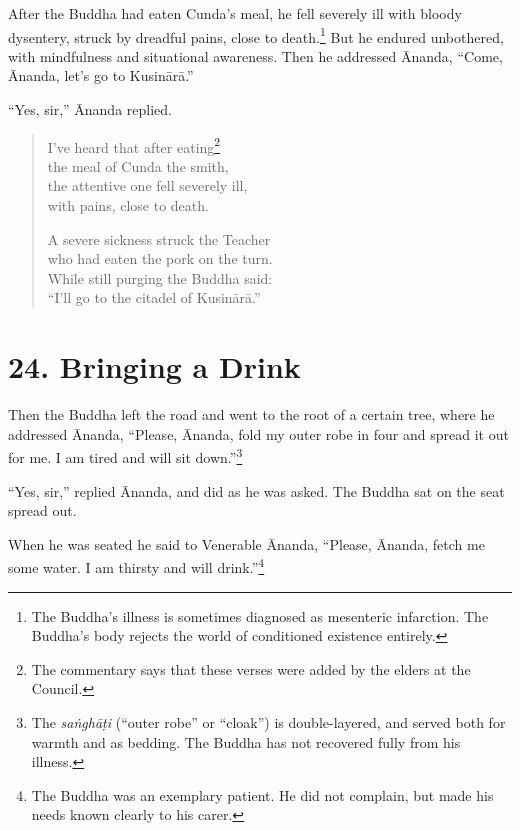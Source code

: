 \documentclass[12pt,openany]{book}%
\begin{document}
After the Buddha had eaten Cunda’s meal, he fell severely ill with bloody dysentery, struck by dreadful pains, close to death.\footnote{The Buddha’s illness is sometimes diagnosed as mesenteric infarction. The Buddha’s body rejects the world of conditioned existence entirely. } But he endured unbothered, with mindfulness and situational awareness. Then he addressed Ānanda, “Come, Ānanda, let’s go to \textsanskrit{Kusinārā}.” 

“Yes, sir,” Ānanda replied. 

\begin{verse}%
I’ve heard that after eating\footnote{The commentary says that these verses were added by the elders at the Council. } \\
the meal of Cunda the smith, \\
the attentive one fell severely ill, \\
with pains, close to death. 

A severe sickness struck the Teacher \\
who had eaten the pork on the turn. \\
While still purging the Buddha said: \\
“I’ll go to the citadel of \textsanskrit{Kusinārā}.” 

%
\end{verse}

\section*{24. Bringing a Drink }

Then the Buddha left the road and went to the root of a certain tree, where he addressed Ānanda, “Please, Ānanda, fold my outer robe in four and spread it out for me. I am tired and will sit down.”\footnote{The \textit{\textsanskrit{saṅghāṭi}} (“outer robe” or “cloak”) is double-layered, and served both for warmth and as bedding. The Buddha has not recovered fully from his illness. } 

“Yes, sir,” replied Ānanda, and did as he was asked. The Buddha sat on the seat spread out. 

When he was seated he said to Venerable Ānanda, “Please, Ānanda, fetch me some water. I am thirsty and will drink.”\footnote{The Buddha was an exemplary patient. He did not complain, but made his needs known clearly to his carer. } 
\end{document}
